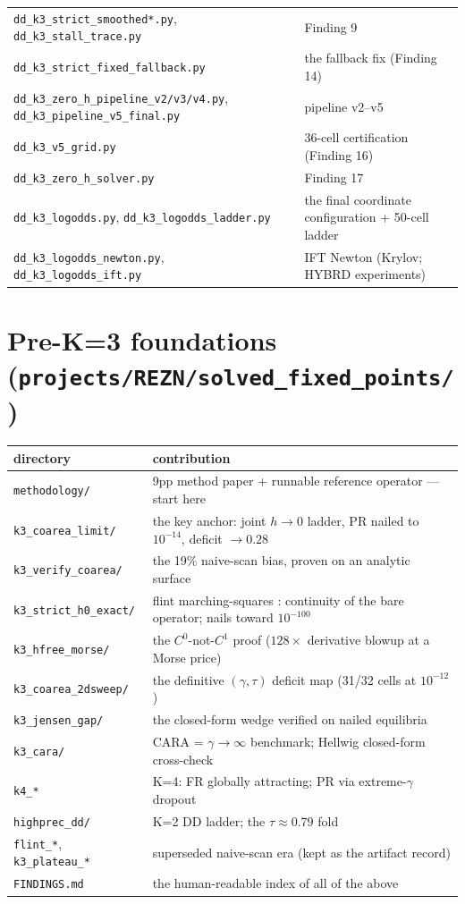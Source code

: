 \begin{center}
\begin{tabularx}{\linewidth}{lX}
\texttt{dd\_k3\_strict\_smoothed*.py}, \texttt{dd\_k3\_stall\_trace.py} & Finding 9 \\
\texttt{dd\_k3\_strict\_fixed\_fallback.py} & the fallback fix (Finding 14) \\
\texttt{dd\_k3\_zero\_h\_pipeline\_v2/v3/v4.py}, \texttt{dd\_k3\_pipeline\_v5\_final.py} & pipeline v2--v5 \\
\texttt{dd\_k3\_v5\_grid.py} & 36-cell certification (Finding 16) \\
\texttt{dd\_k3\_zero\_h\_solver.py} & Finding 17 \\
\texttt{dd\_k3\_logodds.py}, \texttt{dd\_k3\_logodds\_ladder.py} & the final coordinate configuration + 50-cell ladder \\
\texttt{dd\_k3\_logodds\_newton.py}, \texttt{dd\_k3\_logodds\_ift.py} & IFT Newton (Krylov; HYBRD experiments) \\
\bottomrule\end{tabularx}\end{center}

\section{Pre-K=3 foundations (\texttt{projects/REZN/solved\_fixed\_points/})}
\begin{center}\small\begin{tabularx}{\linewidth}{lX}\toprule
directory & contribution \\
\midrule
\texttt{methodology/} & 9pp method paper + runnable reference operator --- start here \\
\texttt{k3\_coarea\_limit/} & the key anchor: joint $h \to 0$ ladder, PR nailed to $10^{-14}$, deficit $\to 0.28$ \\
\texttt{k3\_verify\_coarea/} & the 19\% naive-scan bias, proven on an analytic surface \\
\texttt{k3\_strict\_h0\_exact/} & flint marching-squares \strict{}: continuity of the bare operator; nails toward $10^{-100}$ \\
\texttt{k3\_hfree\_morse/} & the $C^0$-not-$C^1$ proof ($128\times$ derivative blowup at a Morse price) \\
\texttt{k3\_coarea\_2dsweep/} & the definitive $(\gamma, \tau)$ deficit map (31/32 cells at $10^{-12}$) \\
\texttt{k3\_jensen\_gap/} & the closed-form wedge verified on nailed equilibria \\
\texttt{k3\_cara/} & CARA = $\gamma \to \infty$ benchmark; Hellwig closed-form cross-check \\
\texttt{k4\_*} & K=4: FR globally attracting; PR via extreme-$\gamma$ dropout \\
\texttt{highprec\_dd/} & K=2 DD ladder; the $\tau \approx 0.79$ fold \\
\texttt{flint\_*}, \texttt{k3\_plateau\_*} & superseded naive-scan era (kept as the artifact record) \\
\texttt{FINDINGS.md} & the human-readable index of all of the above \\
\bottomrule\end{tabularx}\end{center}

